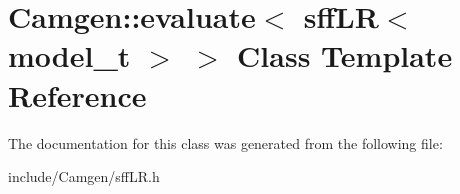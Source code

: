 \hypertarget{a00191}{\section{Camgen\-:\-:evaluate$<$ sff\-L\-R$<$ model\-\_\-t $>$ $>$ Class Template Reference}
\label{a00191}
}


The documentation for this class was generated from the following file\-:\begin{DoxyCompactItemize}
\item 
include/\-Camgen/sff\-L\-R.\-h\end{DoxyCompactItemize}
